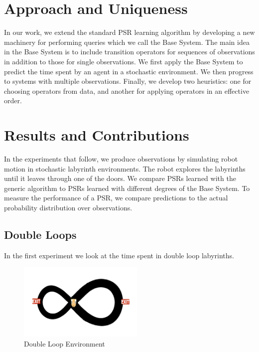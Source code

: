 \documentclass{acm_proc_article-sp}
\begin{document}
\section{Approach and Uniqueness} 

In our work, we extend the standard PSR learning algorithm by developing a new machinery for performing queries which we call the Base System. The main idea in the Base System is to include transition operators for sequences of observations in addition to those for single observations. We first apply the Base System to predict the time spent by an agent in a stochastic environment. We then progress to systems with multiple observations. Finally, we develop two heuristics: one for choosing operators from data, and another for applying operators in an effective order.

\section{Results and Contributions}

In the experiments that follow, we produce observations by simulating robot motion in stochastic labyrinth environments. The robot explores the labyrinths until it leaves through one of the doors. We compare PSRs learned with the generic algorithm to PSRs learned with different degrees of the Base System. To measure the performance of a PSR, we compare predictions to the actual probability distribution over observations.

\subsection{Double Loops}

In the first experiment we look at the time spent in double loop labyrinths. 


\begin{figure}[ht!]
\centering
\includegraphics[width=60mm]{lucasplots/monImages/doubleLoopImage.png}
\caption{Double Loop Environment\label{overflow}}
\end{figure}
\end{document}
